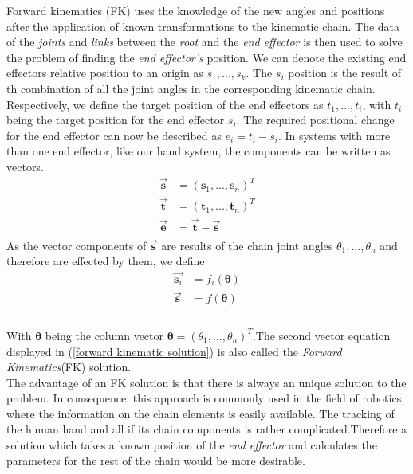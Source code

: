  Forward
 \label{Forward Kinematics}  kinematics (FK) uses the knowledge of the new angles and positions after the application of known transformations to the kinematic chain. The data of the \textit{joints} and \textit{links} between the \textit{root} and the \textit{end effector} is then used to solve the problem of finding the \textit{end effector's} position.
We can denote the existing end effectors relative position to an origin as $ s_{1},...,s_{k}$. The $s_{i}$ position is the result of th combination of all the joint angles in the corresponding kinematic chain. Respectively, we define the target position of the end effectors as $t_{1},...,t_{i}$, with $t_{i}$ being the target position for the end effector $s_{i}$. The required positional change for the end effector can now be described as $e_{i}=t_{i}-s_{i}$. In systems with more than one end effector, like our hand system, the components can be written as vectors.
\begin{equation}
\label{fk components}
\begin{split}
\vec{\textbf{s}}&=(\textbf{s}_{1},...,\textbf{s}_{n})^{T}\\
\vec{\textbf{t}}&=(\textbf{t}_{1},...,\textbf{t}_{n})^{T}\\
\vec{\textbf{e}}&= \vec{\textbf{t}}-\vec{\textbf{s}}\\
\end{split}
\end{equation}
As the vector components of $\vec{\textbf{s}}$ are results of the chain joint angles $\theta_{1},...,\theta_{n}$ and therefore are effected by them, we define 
\begin{equation}
\label{forward kinematic solution}
\begin{split}
\vec{\textbf{s}_{i}}&=f_{i}(\pmb{\theta})\\
\vec{\textbf{s}}&=f(\pmb{\theta})\\
\end{split}
\end{equation}
\\With $\pmb{\theta}$ being the column vector $\pmb{\theta}=(\theta_{1},...,\theta_{n})^{T}$.The second vector equation displayed in (\ref{forward kinematic solution}) is also called the \textit{Forward Kinematics}(FK) solution.
\\The advantage of an FK solution is that there is always an unique solution to the problem. In consequence, this approach is commonly used in the field of robotics, where the information on the chain elements is easily available.
The tracking of the human hand and all if its chain components is rather complicated.Therefore a solution which takes a known position of the \textit{end effector} and calculates the parameters for the rest of the chain would be more desirable.

